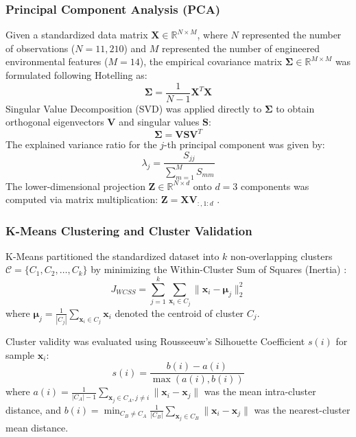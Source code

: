 \documentclass[conference]{IEEEtran}
\begin{document}
\subsubsection{Principal Component Analysis (PCA)}
Given a standardized data matrix $\mathbf{X} \in \mathbb{R}^{N \times M}$, where $N$ represented the number of observations ($N=11,210$) and $M$ represented the number of engineered environmental features ($M=14$), the empirical covariance matrix $\mathbf{\Sigma} \in \mathbb{R}^{M \times M}$ was formulated following Hotelling \cite{hotelling1933} as:
\begin{equation}
\mathbf{\Sigma} = \frac{1}{N-1} \mathbf{X}^T \mathbf{X}
\end{equation}
Singular Value Decomposition (SVD) was applied directly to $\mathbf{\Sigma}$ to obtain orthogonal eigenvectors $\mathbf{V}$ and singular values $\mathbf{S}$:
\begin{equation}
\mathbf{\Sigma} = \mathbf{V} \mathbf{S} \mathbf{V}^T
\end{equation}
The explained variance ratio for the $j$-th principal component was given by:
\begin{equation}
\lambda_j = \frac{S_{jj}}{\sum_{m=1}^M S_{mm}}
\end{equation}
The lower-dimensional projection $\mathbf{Z} \in \mathbb{R}^{N \times d}$ onto $d=3$ components was computed via matrix multiplication: $\mathbf{Z} = \mathbf{X} \mathbf{V}_{:, 1:d}$ \cite{hotelling1933}.

\subsubsection{K-Means Clustering and Cluster Validation}
K-Means partitioned the standardized dataset into $k$ non-overlapping clusters $\mathcal{C} = \{C_1, C_2, \dots, C_k\}$ by minimizing the Within-Cluster Sum of Squares (Inertia) \cite{macqueen1967}:
\begin{equation}
J_{WCSS} = \sum_{j=1}^k \sum_{\mathbf{x}_i \in C_j} \|\mathbf{x}_i - \boldsymbol{\mu}_j\|_2^2
\end{equation}
where $\boldsymbol{\mu}_j = \frac{1}{|C_j|} \sum_{\mathbf{x}_i \in C_j} \mathbf{x}_i$ denoted the centroid of cluster $C_j$.

Cluster validity was evaluated using Rousseeuw's Silhouette Coefficient $s(i)$ \cite{rousseeuw1987} for sample $\mathbf{x}_i$:
\begin{equation}
s(i) = \frac{b(i) - a(i)}{\max(a(i), b(i))}
\end{equation}
where $a(i) = \frac{1}{|C_A|-1} \sum_{\mathbf{x}_j \in C_A, j \ne i} \|\mathbf{x}_i - \mathbf{x}_j\|$ was the mean intra-cluster distance, and $b(i) = \min_{C_B \ne C_A} \frac{1}{|C_B|} \sum_{\mathbf{x}_j \in C_B} \|\mathbf{x}_i - \mathbf{x}_j\|$ was the nearest-cluster mean distance.
\end{document}

